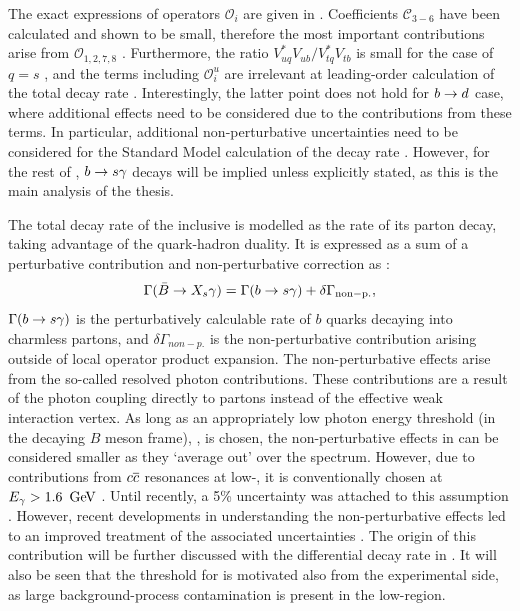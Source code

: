 The exact expressions of operators $\mathcal{O}_i$ are given in . 
Coefficients $\mathcal{C}_{3-6}$ have been calculated and shown to be small, therefore the most important contributions arise from $\mathcal{O}_{1,2,7,8}$ \cite{Chetyrkin:1996vx,Misiak:2020vlo}.
Furthermore, the ratio $V^*_{uq}V_{ub}/V^*_{tq}V_{tb}$ is small for the case of $q=s$ \cite{Charles:2015gya}, and the terms including $\mathcal{O}^u_i$ are irrelevant at leading-order calculation of the total decay rate \cite{Misiak:2015xwa}.
Interestingly, the latter point does not hold for $b\rightarrow d$ case, where additional effects need to be considered due to the contributions from these terms.
In particular, additional non-perturbative uncertainties need to be considered for the Standard Model calculation of the decay rate \cite{Misiak:2015xwa}.
However, for the rest of , $b\rightarrow s\gamma$ decays will be implied unless explicitly stated, as this is the main analysis of the thesis.

The total decay rate of the inclusive \BtoXsgamma is modelled as the rate of its parton decay, taking advantage of the quark-hadron duality.
It is expressed as a sum of a perturbative contribution and non-perturbative correction as \cite{Misiak:2015xwa}:
\begin{equation}\label{eq:btosgammarate_nonp}
    \Gamma(\bar{B}\rightarrow X_s\gamma) = \Gamma(b\rightarrow s\gamma) + \delta\Gamma_{\mathrm{non-p.}},
\end{equation}
$\Gamma(b\rightarrow s\gamma)$ is the perturbatively calculable rate of $b$ quarks decaying into charmless partons, and $\delta\Gamma_{non-p.}$ is the non-perturbative contribution arising outside of local operator product expansion.
The non-perturbative effects arise from the so-called resolved photon contributions.
These contributions are a result of the photon coupling directly to partons instead of the effective weak interaction vertex.
As long as an appropriately low photon energy threshold (in the decaying $B$ meson frame), \EB, is chosen, the non-perturbative effects in  can be considered smaller as they `average out' over the spectrum.
However, due to contributions from $c\overline c$ resonances at low-\Egamma, it is conventionally chosen at ${E_{\gamma}}>1.6~\mathrm{\,Ge\kern -0.1em V}$ \cite{Misiak:2009nr}.
Until recently, a 5\% uncertainty was attached to this assumption \cite{Benzke:2010js}. 
However, recent developments in understanding the non-perturbative effects \cite{Gunawardana:2019gep} led to an improved treatment of the associated uncertainties \cite{Misiak:2020vlo}.
The origin of this contribution will be further discussed with the differential decay rate in .
It will also be seen that the threshold for \EB is motivated also from the experimental side, as large background-process contamination is present in the low-\EB region.

